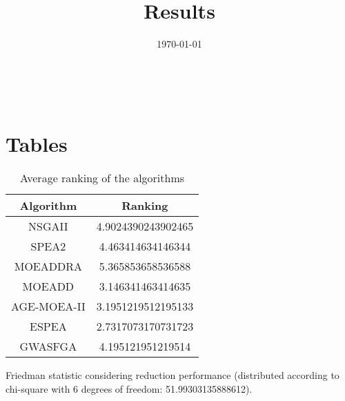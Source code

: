 \documentclass{article}
\title{Results}
\author{}
\date{\today}
\begin{document}
\oddsidemargin 0in \topmargin 0in\maketitle
\
\section{Tables}
\begin{table}[!htp]
\centering
\caption{Average ranking of the algorithms}
\begin{tabular}{c|c}
Algorithm&Ranking\\
\hline
NSGAII&4.9024390243902465\\
SPEA2&4.463414634146344\\
MOEADDRA&5.365853658536588\\
MOEADD&3.146341463414635\\
AGE-MOEA-II&3.1951219512195133\\
ESPEA&2.7317073170731723\\
GWASFGA&4.195121951219514\\
\end{tabular}
\end{table}


Friedman statistic considering reduction performance (distributed according to chi-square with 6 degrees of freedom: 51.99303135888612).
\end{document}
